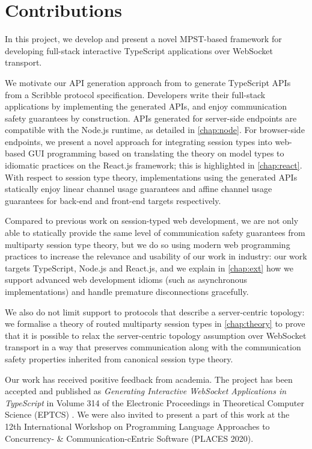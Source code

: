 \section{Contributions}

In this project, we develop and present a novel
MPST-based framework for developing full-stack
interactive TypeScript applications over WebSocket transport.

We motivate our API generation approach from 
\cite{Hybrid2016,PureScript2019} to generate TypeScript APIs
from a Scribble protocol specification.
Developers write their full-stack applications
by implementing the generated APIs, and enjoy 
communication safety guarantees by construction.
APIs generated for server-side endpoints
are compatible with the Node.js runtime,
as detailed in \cref{chap:node}.
For browser-side endpoints,
we present a novel approach for integrating
session types into web-based GUI programming based on
translating the theory on model types \cite{MVU2020}
to idiomatic practices on the React.js framework;
this is highlighted in \cref{chap:react}.
With respect to session type theory, implementations using
the generated APIs statically enjoy linear channel usage
guarantees and affine channel usage guarantees for back-end
and front-end targets respectively.

Compared to previous work 
\cite{Exceptional,PureScript2019,MVU2020,LINKS} on
session-typed web development, 
we are not only able to
statically provide the same level of communication safety
guarantees from multiparty session type theory, but we do so
using modern web programming practices to increase
the relevance and usability of our work in industry:
our work targets TypeScript, Node.js and React.js,
and we explain in \cref{chap:ext} how we support advanced
web development idioms (such as asynchronous implementations)
and handle premature disconnections gracefully.

We also do not limit support to protocols that describe
a server-centric topology: we formalise 
a theory of routed multiparty session types in 
\cref{chap:theory} to prove that it is possible to relax the
server-centric topology assumption over WebSocket transport in a way 
that preserves communication along with the communication safety 
properties inherited from canonical session type theory.

Our work has received positive feedback from academia.
The project has been accepted and published as 
\emph{Generating Interactive WebSocket Applications in TypeScript}
in Volume 314 of the Electronic Proceedings in Theoretical
Computer Science (EPTCS) \cite{PLACES2020}.
We were also invited to present a part of this work
at the 12th International Workshop on
Programming Language Approaches to Concurrency- \& 
Communication-cEntric Software (PLACES 2020).

